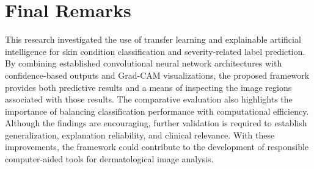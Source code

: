 \section{Final Remarks}

This research investigated the use of transfer learning and explainable artificial intelligence for skin condition classification and severity-related label prediction. By combining established convolutional neural network architectures with confidence-based outputs and Grad-CAM visualizations, the proposed framework provides both predictive results and a means of inspecting the image regions associated with those results. The comparative evaluation also highlights the importance of balancing classification performance with computational efficiency. Although the findings are encouraging, further validation is required to establish generalization, explanation reliability, and clinical relevance. With these improvements, the framework could contribute to the development of responsible computer-aided tools for dermatological image analysis.